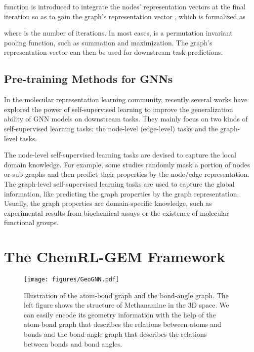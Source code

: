 \documentclass{article}
\begin{document}
 function is introduced to integrate the nodes' representation vectors at the final iteration so as to gain the graph's representation vector , which is formalized as

where  is the number of iterations. In most cases,  is a permutation invariant pooling function, such as summation and maximization.
The graph's representation vector  can then be used for downstream task predictions.

\subsection{Pre-training Methods for GNNs}
In the molecular representation learning community, recently several works \cite{DBLP:conf/iclr/SunHV020,DBLP:conf/iclr/HuLGZLPL20,DBLP:conf/nips/RongBXX0HH20} have explored the power of self-supervised learning to improve the generalization ability of GNN models on downstream tasks. They mainly focus on two kinds of self-supervised learning tasks: the node-level (edge-level) tasks and the graph-level tasks.

The node-level self-supervised learning tasks are devised to capture the local domain knowledge. For example, some studies randomly mask a portion of nodes or sub-graphs and then predict their properties by the node/edge representation. The graph-level self-supervised learning tasks are used to capture the global information, like predicting the graph properties by the graph representation. Usually, the graph properties are domain-specific knowledge, such as experimental results from biochemical assays or the existence of molecular functional groups.

\section{The ChemRL-GEM Framework}
\begin{figure}[t]
\centering
  \texttt{[image: figures/GeoGNN.pdf]}
  \vspace{-0.5em}
  
\caption{Illustration of the atom-bond graph and the bond-angle graph. The left figure shows the structure of Methanamine in the 3D space. We can easily encode its geometry information with the help of the atom-bond graph that describes the relations between atoms and bonds and the bond-angle graph that describes the relations between bonds and bond angles.}
\label{fig:double_graph}
\end{figure}
\end{document}
